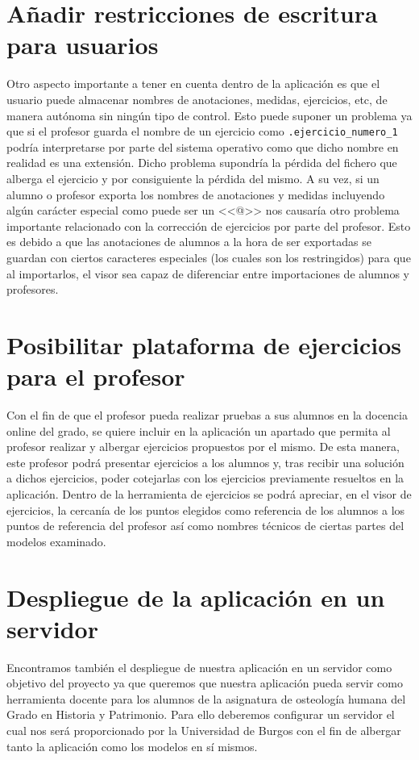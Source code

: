\section{Añadir restricciones de escritura para usuarios}
Otro aspecto importante a tener en cuenta dentro de la aplicación es que el usuario puede almacenar nombres de anotaciones, medidas, ejercicios, etc, de manera autónoma sin ningún tipo de control. Esto puede suponer un problema ya que si el profesor guarda el nombre de un ejercicio como \texttt{.ejercicio\_numero\_1} podría interpretarse por parte del sistema operativo como que dicho nombre en realidad es una extensión. Dicho problema supondría la pérdida del fichero que alberga el ejercicio y por consiguiente la pérdida del mismo. A su vez, si un alumno o profesor exporta los nombres de anotaciones y medidas incluyendo algún carácter especial como puede ser un <<@>> nos causaría otro problema importante relacionado con la corrección de ejercicios por parte del profesor. Esto es debido a que las anotaciones  de alumnos a la hora de ser exportadas se guardan con ciertos caracteres especiales (los cuales son los restringidos) para que al importarlos, el visor sea capaz de diferenciar entre importaciones de alumnos y profesores.

\section{Posibilitar plataforma de ejercicios para el profesor}
Con el fin de que el profesor pueda realizar pruebas a sus alumnos en la docencia online del grado, se quiere incluir en la aplicación un apartado que permita al profesor realizar y albergar ejercicios propuestos por el mismo. De esta manera, este profesor podrá presentar ejercicios a los alumnos y, tras recibir una solución a dichos ejercicios, poder cotejarlas con los ejercicios previamente resueltos en la aplicación. Dentro de la herramienta de ejercicios se podrá apreciar, en el visor de ejercicios, la cercanía de los puntos elegidos como referencia de los alumnos a los puntos de referencia del profesor así como nombres técnicos de ciertas partes del modelos examinado.

\section{Despliegue de la aplicación en un servidor}
Encontramos también el despliegue de nuestra aplicación en un servidor como objetivo del proyecto ya que queremos que nuestra aplicación pueda servir como herramienta docente para los alumnos de la asignatura de osteología humana del Grado en Historia y Patrimonio. Para ello deberemos configurar un servidor el cual nos será proporcionado por la Universidad de Burgos con el fin de albergar tanto la aplicación como los modelos en sí mismos.

